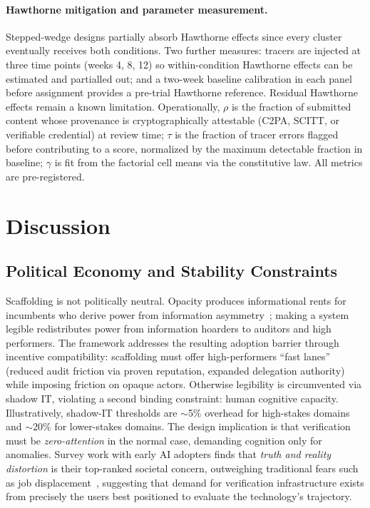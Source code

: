 \documentclass[runningheads]{llncs}
\begin{document}
\paragraph{Hawthorne mitigation and parameter measurement.}
Stepped-wedge designs partially absorb Hawthorne effects since every cluster eventually receives both conditions. Two further measures: tracers are injected at three time points (weeks 4, 8, 12) so within-condition Hawthorne effects can be estimated and partialled out; and a two-week baseline calibration in each panel before assignment provides a pre-trial Hawthorne reference. Residual Hawthorne effects remain a known limitation. Operationally, $\rho$ is the fraction of submitted content whose provenance is cryptographically attestable (C2PA, SCITT, or verifiable credential) at review time; $\tau$ is the fraction of tracer errors flagged before contributing to a score, normalized by the maximum detectable fraction in baseline; $\gamma$ is fit from the factorial cell means via the constitutive law. All metrics are pre-registered.


\section{Discussion}
\label{sec:discussion}

\subsection{Political Economy and Stability Constraints}

Scaffolding is not politically neutral. Opacity produces informational rents for incumbents who derive power from information asymmetry~\cite{holmstrom1991multitask}; making a system legible redistributes power from information hoarders to auditors and high performers. The framework addresses the resulting adoption barrier through incentive compatibility: scaffolding must offer high-performers ``fast lanes'' (reduced audit friction via proven reputation, expanded delegation authority) while imposing friction on opaque actors. Otherwise legibility is circumvented via shadow IT, violating a second binding constraint: human cognitive capacity. Illustratively, shadow-IT thresholds are $\sim$5\% overhead for high-stakes domains and $\sim$20\% for lower-stakes domains. The design implication is that verification must be \emph{zero-attention} in the normal case, demanding cognition only for anomalies. Survey work with early AI adopters finds that \emph{truth and reality distortion} is their top-ranked societal concern, outweighing traditional fears such as job displacement~\cite{orban2025paradox}, suggesting that demand for verification infrastructure exists from precisely the users best positioned to evaluate the technology's trajectory.
\end{document}
